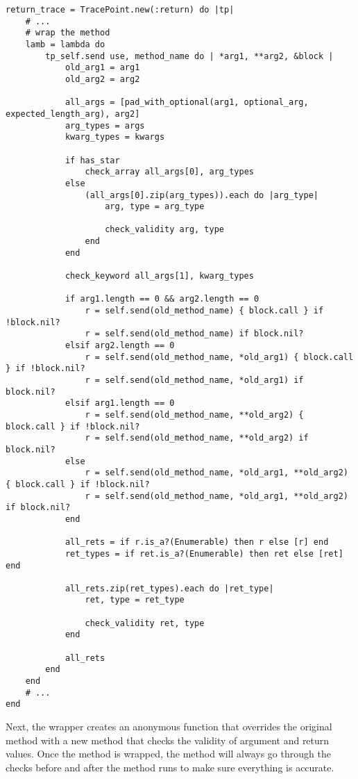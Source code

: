 \begin{lstlisting}[caption={wrap the method with checks and replace it}]
return_trace = TracePoint.new(:return) do |tp|
    # ...
    # wrap the method
    lamb = lambda do
        tp_self.send use, method_name do | *arg1, **arg2, &block |
            old_arg1 = arg1
            old_arg2 = arg2

            all_args = [pad_with_optional(arg1, optional_arg, expected_length_arg), arg2]
            arg_types = args
            kwarg_types = kwargs

            if has_star
                check_array all_args[0], arg_types
            else
                (all_args[0].zip(arg_types)).each do |arg_type|
                    arg, type = arg_type

                    check_validity arg, type
                end
            end

            check_keyword all_args[1], kwarg_types

            if arg1.length == 0 && arg2.length == 0
                r = self.send(old_method_name) { block.call } if !block.nil?
                r = self.send(old_method_name) if block.nil?
            elsif arg2.length == 0
                r = self.send(old_method_name, *old_arg1) { block.call } if !block.nil?
                r = self.send(old_method_name, *old_arg1) if block.nil?
            elsif arg1.length == 0
                r = self.send(old_method_name, **old_arg2) { block.call } if !block.nil?
                r = self.send(old_method_name, **old_arg2) if block.nil?
            else
                r = self.send(old_method_name, *old_arg1, **old_arg2) { block.call } if !block.nil?
                r = self.send(old_method_name, *old_arg1, **old_arg2) if block.nil?
            end

            all_rets = if r.is_a?(Enumerable) then r else [r] end
            ret_types = if ret.is_a?(Enumerable) then ret else [ret] end

            all_rets.zip(ret_types).each do |ret_type|
                ret, type = ret_type
                        
                check_validity ret, type
            end

            all_rets
        end
    end
    # ...
end

\end{lstlisting}

Next, the wrapper creates an anonymous function that overrides the original method with a new method that checks the validity of argument and return values.  Once the method is wrapped, the method will always go through the checks before and after the method runs to make sure everything is accurate.

